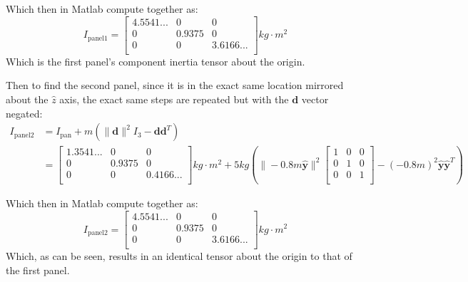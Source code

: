 \documentclass[titlepage]{article}
\begin{document}
\begin{mdframed}[linewidth=1pt, innertopmargin=10pt, innerbottommargin=10pt]
	Which then in Matlab compute together as:
	\begin{equation}
		I_{\text{panel1}}=
		\begin{bmatrix}
			4.5541... & 0 & 0 \\
			0 & 0.9375 & 0 \\
			0 & 0 & 3.6166... \\
		\end{bmatrix}kg\cdot m^2
	\end{equation}
	Which is the first panel's component inertia tensor about the origin.
\end{mdframed}

Then to find the second panel, since it is in the exact same location mirrored about the $\hat{z}$ axis, the exact same steps are repeated but with the $\boldsymbol{d}$ vector negated:
\tiny
\begin{equation}
	\begin{split}
		I_{\text{panel2}}&=I_{\text{pan}}+m\left(\|\boldsymbol{d}\|^2I_3-\boldsymbol{d}\boldsymbol{d}^T\right) \\
		&=
		\begin{bmatrix}
			1.3541... & 0 & 0 \\
			0 & 0.9375 & 0 \\
			0 & 0 & 0.4166... \\
		\end{bmatrix}kg\cdot m^2+5kg\left(\|-0.8m\hat{\boldsymbol{y}}\|^2
		\begin{bmatrix}
			1 & 0 & 0 \\
			0 & 1 & 0 \\
			0 & 0 & 1 \\
		\end{bmatrix}-(-0.8m)^2\hat{\boldsymbol{y}}\hat{\boldsymbol{y}}^T\right)
	\end{split}
\end{equation}
\normalsize

\begin{mdframed}[linewidth=1pt, innertopmargin=10pt, innerbottommargin=10pt]
	Which then in Matlab compute together as:
	\begin{equation}
		I_{\text{panel2}}=
		\begin{bmatrix}
			4.5541... & 0 & 0 \\
			0 & 0.9375 & 0 \\
			0 & 0 & 3.6166... \\ 
		\end{bmatrix}  kg\cdot m^2
	\end{equation}
	Which, as can be seen, results in an identical tensor about the origin to that of the first panel.
\end{mdframed}
\end{document}
